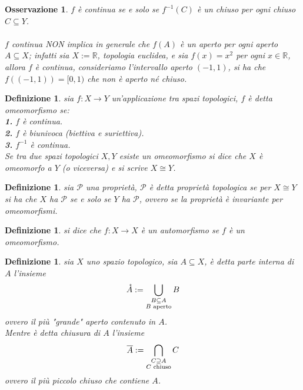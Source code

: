 \documentclass[oneside, 11pt]{amsbook}
\newcommand{\0}{{(0)}}
\newcommand{\3}{{(3)}}
\theoremstyle{colonplain}
\theoremstyle{colondefinition}
\newtheorem{defn}[thm]{Definizione}
\theoremstyle{colonremark}
\newtheorem{rmk}[thm]{Osservazione}
\numberwithin{equation}{chapter}
\begin{document}
\begin{rmk} $f$ è continua se e solo se $f^{-1}(C)$ è un chiuso per ogni chiuso $C \subseteq Y$. \\ \\
$f$ continua NON implica in generale che $f(A)$ è un aperto per ogni aperto $A \subseteq X$; infatti sia $X := \mathbb{R}$, topologia euclidea, e sia $f(x) = x^2$ per ogni $x \in \mathbb{R}$, allora $f$ è continua, consideriamo l'intervallo aperto $(-1, 1)$, si ha che $f((-1, 1)) = [0, 1)$ che non è aperto né chiuso.
\end{rmk}
\begin{defn} sia $f : X \longrightarrow Y$ un'applicazione tra spazi topologici, $f$ è detta \textit{omeomorfismo} se: \\
\textbf{1.} $f$ è continua. \\
\textbf{2.} $f$ è biunivoca (biettiva e suriettiva). \\
\textbf{3.} $f^{-1}$ è continua. \\
Se tra due spazi topologici $X, Y$ esiste un omeomorfismo si dice che $X$ è omeomorfo a $Y$ (o viceversa) e si scrive $X \cong Y$.
\end{defn}
\begin{defn}
sia $\mathcal{P}$ una proprietà, $\mathcal{P}$ è detta \textit{proprietà topologica} se per $X \cong Y$ si ha che $X$ ha $\mathcal{P}$ se e solo se $Y$ ha $\mathcal{P}$, ovvero se la proprietà è invariante per omeomorfismi.
\end{defn}
\begin{defn}
si dice che $f : X \longrightarrow X$ è un \textit{automorfismo} se $f$ è un omeomorfismo.
\end{defn}
\begin{defn}
sia $X$ uno spazio topologico, sia $A \subseteq X$, è detta \textit{parte interna di $A$} l'insieme
\begin{align}
    \mathring{A} := \bigcup_{\substack{B \subseteq A \\ B \text{ aperto}}} B \notag
\end{align}
ovvero il più "grande" aperto contenuto in $A$. \\
Mentre è detta \textit{chiusura di $A$} l'insieme
\begin{align}
    \overline{A} := \bigcap_{\substack{C \supseteq A \\ C \text{ chiuso}}} C \notag
\end{align}
ovvero il più piccolo chiuso che contiene $A$.
\end{defn}
\end{document}
